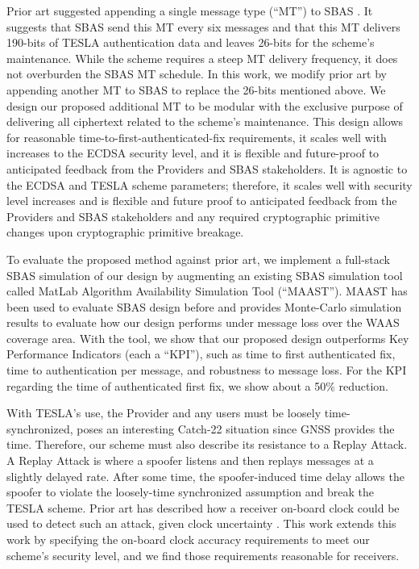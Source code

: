 \documentclass[letterpaper,times]{IONconf/IONconf}
\begin{document}
Prior art suggested appending a single message type (``MT'') to SBAS \cite{Neish_Dissertation}.
It suggests that SBAS send this MT every six messages and that this MT delivers 190-bits of TESLA authentication data and leaves 26-bits for the scheme's maintenance.
While the scheme requires a steep MT delivery frequency, it does not overburden the SBAS MT schedule.
In this work, we modify prior art by appending another MT to SBAS to replace the 26-bits mentioned above.
We design our proposed additional MT to be modular with the exclusive purpose of delivering all ciphertext related to the scheme's maintenance.
This design allows for reasonable time-to-first-authenticated-fix requirements, it scales well with increases to the ECDSA security level, and it is flexible and future-proof to anticipated feedback from the Providers and SBAS stakeholders.
It is agnostic to the ECDSA and TESLA scheme parameters; therefore, it scales well with security level increases and is flexible and future proof to anticipated feedback from the Providers and SBAS stakeholders and any required cryptographic primitive changes upon cryptographic primitive breakage.

To evaluate the proposed method against prior art, we implement a full-stack SBAS simulation of our design by augmenting an existing SBAS simulation tool called MatLab Algorithm Availability Simulation Tool (``MAAST'')\cite{MAAST}.
MAAST has been used to evaluate SBAS design before and provides Monte-Carlo simulation results to evaluate how our design performs under message loss over the WAAS coverage area.
With the tool, we show that our proposed design outperforms Key Performance Indicators (each a ``KPI''), such as time to first authenticated fix, time to authentication per message, and robustness to message loss.
For the KPI regarding the time of authenticated first fix, we show about a 50\% reduction. 

With TESLA's use, the Provider and any users must be loosely time-synchronized, poses an interesting Catch-22 situation since GNSS provides the time.
Therefore, our scheme must also describe its resistance to a Replay Attack.
A Replay Attack is where a spoofer listens and then replays messages at a slightly delayed rate.
After some time, the spoofer-induced time delay allows the spoofer to violate the loosely-time synchronized assumption and break the TESLA scheme.
Prior art has described how a receiver on-board clock could be used to detect such an attack, given clock uncertainty \cite{time_sync_paper}.
This work extends this work by specifying the on-board clock accuracy requirements to meet our scheme's security level, and we find those requirements reasonable for receivers.



\end{document}
